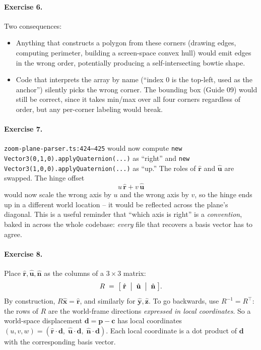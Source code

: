 \documentclass{article}
\begin{document}
\paragraph{Exercise 6.}
Two consequences:
\begin{itemize}
    \item Anything that constructs a polygon from these corners (drawing
          edges, computing perimeter, building a screen-space convex hull)
          would emit edges in the wrong order, potentially producing a
          self-intersecting bowtie shape.
    \item Code that interprets the array by name (``index 0 is the
          top-left, used as the anchor'') silently picks the wrong corner.
          The bounding box (Guide 09) would still be correct, since it
          takes min/max over all four corners regardless of order, but any
          per-corner labeling would break.
\end{itemize}

\paragraph{Exercise 7.}
\texttt{zoom-plane-parser.ts:424--425} would now compute
\verb|new Vector3(0,1,0).applyQuaternion(...)| as ``right'' and
\verb|new Vector3(1,0,0).applyQuaternion(...)| as ``up.'' The roles of
$\hat{\mathbf{r}}$ and $\hat{\mathbf{u}}$ are swapped. The hinge offset
\[
    u\,\hat{\mathbf{r}} + v\,\hat{\mathbf{u}}
\]
would now scale the wrong axis by $u$ and the wrong axis by $v$, so the
hinge ends up in a different world location -- it would be reflected across
the plane's diagonal. This is a useful reminder that ``which axis is right''
is a \emph{convention}, baked in across the whole codebase: \emph{every}
file that recovers a basis vector has to agree.

\paragraph{Exercise 8.}
Place $\hat{\mathbf{r}}, \hat{\mathbf{u}}, \hat{\mathbf{n}}$ as the columns
of a $3 \times 3$ matrix:
\[
    R \;=\; \bigl[\;\hat{\mathbf{r}}\;\bigm|\;\hat{\mathbf{u}}\;\bigm|\;\hat{\mathbf{n}}\;\bigr].
\]
By construction, $R \hat{\mathbf{x}} = \hat{\mathbf{r}}$, and similarly for
$\hat{\mathbf{y}}, \hat{\mathbf{z}}$. To go backwards, use $R^{-1} = R^{\top}$:
the rows of $R$ are the world-frame directions \emph{expressed in local
coordinates}. So a world-space displacement $\mathbf{d} = \mathbf{p} - \mathbf{c}$
has local coordinates
$(u, v, w) = (\hat{\mathbf{r}} \cdot \mathbf{d},\; \hat{\mathbf{u}} \cdot \mathbf{d},\; \hat{\mathbf{n}} \cdot \mathbf{d})$.
Each local coordinate is a dot product of $\mathbf{d}$ with the corresponding
basis vector.
\end{document}
